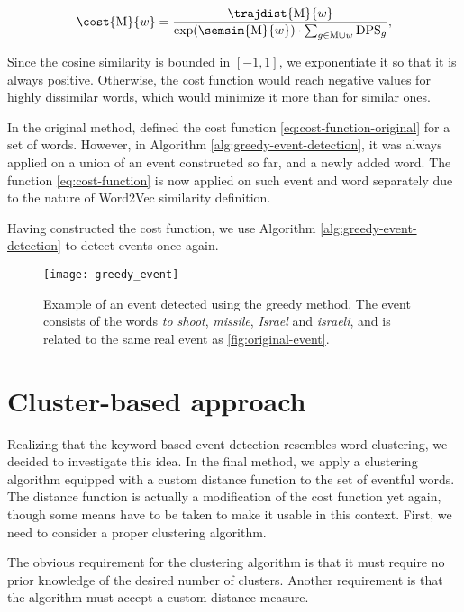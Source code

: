 \begin{equation} \label{eq:cost-function}
	\cost{\featset}{w} = \frac{\trajdist{\featset}{w}}{\exp(\semsim{\featset}{w}) \cdot \sum_{g \in \featset \cup w}{\text{DPS}_{g}}},
\end{equation}

Since the cosine similarity is bounded in $[-1, 1]$, we exponentiate it so that it is always positive. Otherwise, the cost function would reach negative values for highly dissimilar words, which would minimize it more than for similar ones.

In the original method, \cite{event-detection} defined the cost function \ref{eq:cost-function-original} for a set of words. However, in Algorithm \ref{alg:greedy-event-detection}, it was always applied on a union of an event constructed so far, and a newly added word. The function \ref{eq:cost-function} is now applied on such event and word separately due to the nature of Word2Vec similarity definition.

Having constructed the cost function, we use Algorithm \ref{alg:greedy-event-detection} to detect events once again.


\begin{figure}[H]
  \centering
  \texttt{[image: greedy\_event]}  %
  \caption{Example of an event detected using the greedy method. The event consists of the words \textit{to shoot}, \textit{missile}, \textit{Israel} and \textit{israeli}, and is related to the same real event as \autoref{fig:original-event}.}
  \label{fig:greedy-event}
\end{figure}


\section{Cluster-based approach}
Realizing that the keyword-based event detection resembles word clustering, we decided to investigate this idea. In the final method, we apply a clustering algorithm equipped with a custom distance function to the set of eventful words. The distance function is actually a modification of the cost function yet again, though some means have to be taken to make it usable in this context. First, we need to consider a proper clustering algorithm.

The obvious requirement for the clustering algorithm is that it must require no prior knowledge of the desired number of clusters. Another requirement is that the algorithm must accept a custom distance measure.

